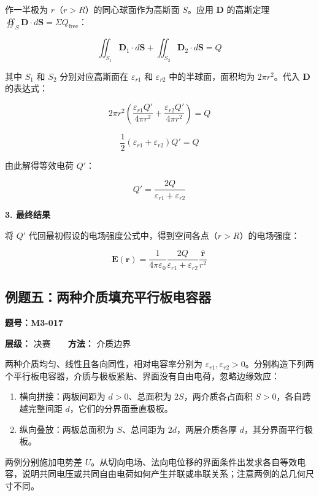 作一半极为 \(r\)（\(r > R\)）的同心球面作为高斯面 \(S\)。应用
\(\mathbf{D}\) 的高斯定理
\(\oiint_S \mathbf{D} \cdot d\mathbf{S} = \Sigma Q_{\text{free}}\)：

\[
\iint_{S_1} \mathbf{D}_1 \cdot d\mathbf{S} + \iint_{S_2} \mathbf{D}_2 \cdot d\mathbf{S} = Q
\]

其中 \(S_1\) 和 \(S_2\) 分别对应高斯面在 \(\varepsilon_{r1}\) 和
\(\varepsilon_{r2}\) 中的半球面，面积均为 \(2\pi r^2\)。代入
\(\mathbf{D}\) 的表达式：

\[
2\pi r^2 \left( \frac{\varepsilon_{r1} Q'}{4\pi r^2} + \frac{\varepsilon_{r2} Q'}{4\pi r^2} \right) = Q
\]

\[
\frac{1}{2}(\varepsilon_{r1} + \varepsilon_{r2}) Q' = Q
\]

由此解得等效电荷 \(Q'\)：

\[
Q' = \frac{2Q}{\varepsilon_{r1} + \varepsilon_{r2}}
\]

\textbf{3. 最终结果}

将 \(Q'\)
代回最初假设的电场强度公式中，得到空间各点（\(r > R\)）的电场强度：

\[
\mathbf{E}(\mathbf{r}) = \frac{1}{4\pi\varepsilon_0} \frac{2Q}{\varepsilon_{r1} + \varepsilon_{r2}} \frac{\hat{\mathbf{r}}}{r^2}
\]

\subsection{例题五：两种介质填充平行板电容器}\label{m3:ux4f8bux9898ux4e94ux4e24ux79cdux4ecbux8d28ux586bux5145ux5e73ux884cux677fux7535ux5bb9ux5668}

\textbf{题号：M3-017}

\textbf{层级：} 决赛　　\textbf{方法：} 介质边界

两种介质均匀、线性且各向同性，相对电容率分别为
\(\varepsilon_{r1},\varepsilon_{r2}>0\)。分别构造下列两个平行板电容器，介质与极板紧贴、界面没有自由电荷，忽略边缘效应：

\begin{enumerate}
\def\labelenumi{(\arabic{enumi})}
\item
  横向拼接：两板间距为 \(d>0\)、总面积为 \(2S\)，两介质各占面积
  \(S>0\)，各自跨越完整间距 \(d\)，它们的分界面垂直极板。
\item
  纵向叠放：两板总面积为 \(S\)、总间距为 \(2d\)，两层介质各厚
  \(d\)，其分界面平行极板。
\end{enumerate}

两例分别施加电势差
\(U\)。从切向电场、法向电位移的界面条件出发求各自等效电容，说明共同电压或共同自由电荷如何产生并联或串联关系；注意两例的总几何尺寸不同。

